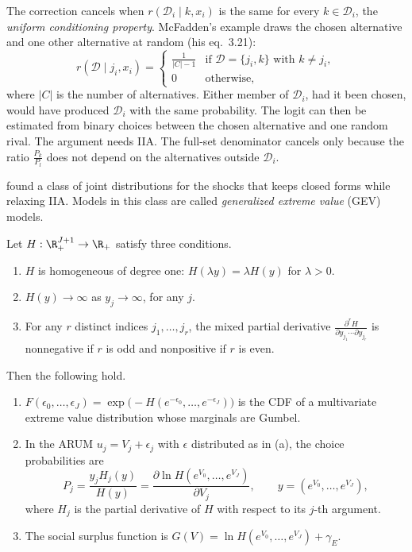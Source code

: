 \begin{remark}
The correction cancels when $r(\mathcal{D}_i \mid k, x_i)$ is the same for every $k \in \mathcal{D}_i$, the
\emph{uniform conditioning property}. McFadden's example draws the chosen alternative and one other alternative at
random (his eq.~3.21):
\begin{equation*}
r(\mathcal{D} \mid j_i, x_i) = \begin{cases} \frac{1}{|C| - 1} & \text{if } \mathcal{D} = \{j_i, k\} \text{ with } k \neq j_i,\\
0 & \text{otherwise,}\end{cases}
\end{equation*}
where $|C|$ is the number of alternatives. Either member of $\mathcal{D}_i$, had it been chosen, would have produced
$\mathcal{D}_i$ with the same probability. The logit can then be estimated from binary choices between the chosen
alternative and one random rival. The argument needs IIA. The full-set denominator cancels only because the ratio
$\frac{P_k}{P_l}$ does not depend on the alternatives outside $\mathcal{D}_i$.
\end{remark}

\citet{McFadden1978} found a class of joint distributions for the shocks that keeps closed forms while
relaxing IIA. Models in this class are called \emph{generalized extreme value} (GEV) models.

\begin{theorem}\label{thm:06-gev}
Let $H : \R^{J+1}_+ \to \R_+$ satisfy three conditions.
\begin{enumerate}[label=(G\arabic*)]
  \item $H$ is homogeneous of degree one: $H(\lambda y) = \lambda H(y)$ for $\lambda > 0$.
  \item $H(y) \to \infty$ as $y_j \to \infty$, for any $j$.
  \item For any $r$ distinct indices $j_1, \dots, j_r$, the mixed partial derivative
  $\frac{\partial^r H}{\partial y_{j_1}\cdots\partial y_{j_r}}$ is nonnegative if $r$ is odd and nonpositive if $r$
  is even.
\end{enumerate}
Then the following hold.
\begin{enumerate}[label=(\alph*)]
  \item $F(\epsilon_0, \dots, \epsilon_J) = \exp\big(-H(e^{-\epsilon_0}, \dots, e^{-\epsilon_J})\big)$ is the CDF of a
  multivariate extreme value distribution whose marginals are Gumbel.
  \item In the ARUM $u_j = V_j + \epsilon_j$ with $\epsilon$ distributed as in (a), the choice probabilities are
  \begin{equation}\label{eq:06-gevprob}
  P_j = \frac{y_j H_j(y)}{H(y)} = \frac{\partial\ln H(e^{V_0}, \dots, e^{V_J})}{\partial V_j},
  \qquad y = (e^{V_0}, \dots, e^{V_J}),
  \end{equation}
  where $H_j$ is the partial derivative of $H$ with respect to its $j$-th argument.
  \item The social surplus function is $G(V) = \ln H(e^{V_0}, \dots, e^{V_J}) + \gamma_E$.
\end{enumerate}
\end{theorem}

